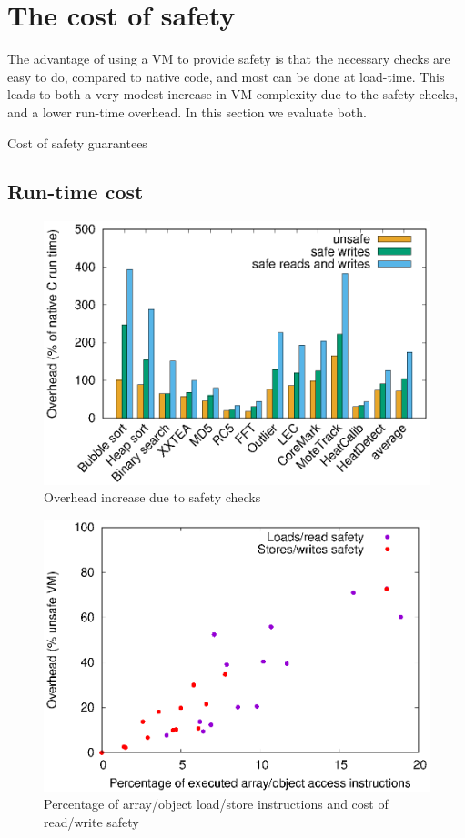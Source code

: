 \section{The cost of safety}
\label{sec-evaluation-safety}

The advantage of using a VM to provide safety is that the necessary checks are easy to do, compared to native code, and most can be done at load-time. This leads to both a very modest increase in VM complexity due to the safety checks, and a lower run-time overhead. In this section we evaluate both.


\begin{landscape}
\begin{table}[]
 \centering
 \caption{Cost of safety guarantees}
 \label{tbl-safety-cost}
 
\end{table}
\end{landscape}


\subsection{Run-time cost}
\label{sec-evaluation-run-time-cost}
\begin{figure}[]
  \centering
  \includegraphics[width=0.6\linewidth]{safety-cost.eps}
  \caption{Overhead increase due to safety checks}
  \label{fig-safety-cost-per-benchmark}
\end{figure}

\begin{figure}[]
   \centering
  \includegraphics[width=0.6\linewidth]{safety-ld-st-percentage-vs-overhead.eps}
  \caption{Percentage of array/object load/store instructions and cost of read/write safety}
  \label{fig-safety-ld-st-percentage-vs-overhead}
\end{figure}

